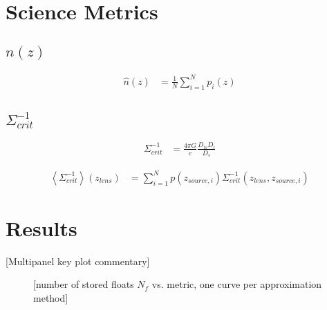 \documentclass[\docopts]{\docclass}
\begin{document}
\section{Science Metrics}
\label{sec:science}

\subsection{$n(z)$}
\label{sec:nz}

\begin{align}
\hat{n}(z) &= \frac{1}{N}\sum_{i=1}^{N}p_{i}(z)
\label{eq:nz}
\end{align}

\subsection{$\Sigma_{crit}^{-1}$}
\label{sec:sigma}

\citet{bonnett_redshift_2015}

\begin{align}
\Sigma_{crit}^{-1} &= \frac{4\pi G}{c}\frac{D_{ls}D_{l}}{D_{s}}
\label{eq:sigma}
\end{align}

\begin{align}
\left\langle\Sigma_{crit}^{-1}\right\rangle(z_{lens}) &= \sum_{i=1}^{N}p(z_{source, i})\Sigma_{crit}^{-1}(z_{lens}, z_{source, i})
\label{eq:meansigma}
\end{align}


\section{Results}
\label{sec:results}

%

[Multipanel key plot commentary]

\begin{figure}
\caption{[number of stored floats $N_{f}$ vs. metric, one curve per approximation method]\label{fig:results}}
\end{figure}
\end{document}
